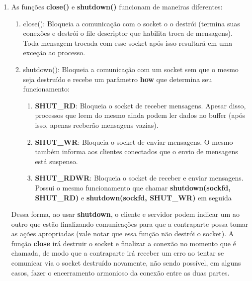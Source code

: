 \documentclass[12pt,a4paper]{report}
\begin{document}
\begin{enumerate}
    \item As funções \textbf{close()} e \textbf{shutdown()} funcionam de maneiras diferentes:
    \begin{enumerate}
        \item close(): Bloqueia a comunicação com o socket o o destrói (termina suas conexões e destrói o file descriptor que habilita troca de mensagens). Toda mensagem trocada com esse socket após isso resultará em uma exceção ao processo.
        
        \item shutdown(): Bloqueia a comunicação com um socket sem que o mesmo seja destruído e recebe um parâmetro \textbf{how} que determina seu funcionamento:
        \begin{enumerate}
            \item \textbf{SHUT\_RD}: Bloqueia o socket de receber mensagens. Apesar disso, processos que leem do mesmo ainda podem ler dados no buffer (após isso, apenas reeberão mensagens vazias).
            
            \item \textbf{SHUT\_WR}: Bloqueia o socket de enviar mensagens. O mesmo também informa aos clientes conectados que o envio de mensagens está suspenso.
            
            \item \textbf{SHUT\_RDWR}: Bloqueia o socket de receber e enviar mensagens. Possui o mesmo funcionamento que chamar \textbf{shutdown(sockfd, SHUT\_RD)} e \textbf{shutdown(sockfd, SHUT\_WR)} em seguida
        \end{enumerate}
    \end{enumerate}
    
    Dessa forma, ao usar \textbf{shutdown}, o cliente e servidor podem indicar um ao outro que estão finalizando comunicações para que a contraparte possa tomar as ações apropriadas (vale notar que essa função não destrói o socket). A função \textbf{close} irá destruir o socket e finalizar a conexão no momento que é chamada, de modo que a contraparte irá receber um erro ao tentar se comunicar via o socket destruído novamente, não sendo possível, em alguns casos, fazer o encerramento armonioso da conexão entre as duas partes.
\end{enumerate}
\end{document}
